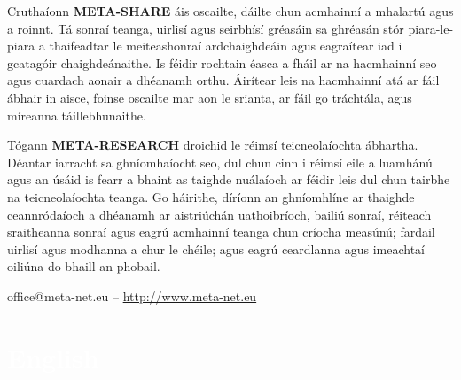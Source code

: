 \begin{multicols}{2}
Cruthaíonn \textbf{META-SHARE} áis oscailte, dáilte chun acmhainní a mhalartú agus a roinnt. Tá sonraí teanga, uirlisí agus seirbhísí gréasáin sa ghréasán stór piara-le-piara a thaifeadtar le meiteashonraí ardchaighdeáin agus eagraítear iad i gcatagóir chaighdeánaithe. Is féidir rochtain éasca a fháil ar na hacmhainní seo agus cuardach aonair a dhéanamh orthu. Áirítear leis na hacmhainní atá ar fáil ábhair in aisce, foinse oscailte mar aon le srianta, ar fáil go tráchtála, agus míreanna táillebhunaithe. 

Tógann \textbf{META-RESEARCH} droichid le réimsí teicneolaíochta ábhartha. Déantar iarracht sa ghníomhaíocht seo, dul chun cinn i réimsí eile a luamhánú agus an úsáid is fearr a bhaint as taighde nuálaíoch ar féidir leis dul chun tairbhe na teicneolaíochta teanga. Go háirithe, díríonn an ghníomhlíne ar thaighde ceannródaíoch a dhéanamh ar aistriúchán uathoibríoch, bailiú sonraí, réiteach sraitheanna sonraí agus eagrú acmhainní teanga chun críocha measúnú; fardail uirlisí agus modhanna a chur le chéile; agus eagrú ceardlanna agus imeachtaí oiliúna do bhaill an phobail.


\centerline{office@meta-net.eu -- \url{http://www.meta-net.eu}}

\end{multicols}



\makeatletter
{}
{
  \renewcommand*{\theHsection}{\thepart.\thesection}
}
\makeatother
\part*{\textcolor{white}{English}}
\setcounter{section}{0}
\setcounter{figure}{0}







